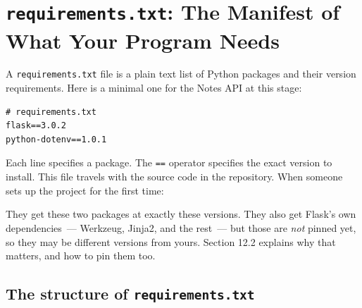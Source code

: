 \setcounter{section}{0}
\section{\texorpdfstring{\texttt{requirements.txt}: The Manifest of What Your Program Needs}{requirements.txt: The Manifest of What Your Program Needs}}\label{12-dependency-declaration:121-requirementstxt-the-manifest-of-what-your-program-needs}

A \texttt{requirements.txt} file is a plain text list of Python packages and their version requirements. Here is a minimal one for the Notes API at this stage:

\begin{outputbox}[short]
\begin{Verbatim}[fontsize=\codesize, breaklines, breakanywhere, breaksymbolleft={\tiny\textcolor{muted}{$\hookrightarrow$}}]
# requirements.txt
flask==3.0.2
python-dotenv==1.0.1
\end{Verbatim}
\end{outputbox}

\noindent{}Each line specifies a package. The \texttt{==} operator specifies the exact version to install. This file travels with the source code in the repository. When someone sets up the project for the first time:

\begin{codebox}[short]

\begin{Shaded}
\begin{Highlighting}[]
 
\end{Highlighting}
\end{Shaded}

\end{codebox}

\noindent{}They get these two packages at exactly these versions. They also get Flask's own dependencies~--- Werkzeug, Jinja2, and the rest~--- but those are \emph{not} pinned yet, so they may be different versions from yours. Section 12.2 explains why that matters, and how to pin them too.

\subsection*{\texorpdfstring{The structure of \texttt{requirements.txt}}{The structure of requirements.txt}}\label{12-dependency-declaration:the-structure-of-requirementstxt}

